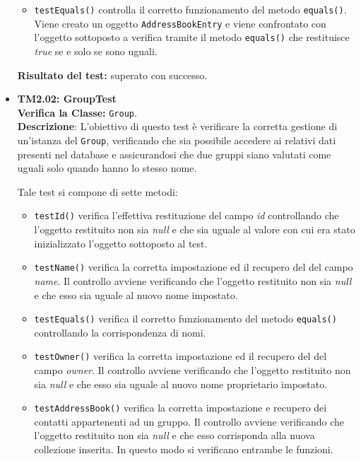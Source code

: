 \begin{itemize}
\begin{itemize}
\item\texttt{testEquals()} controlla  il corretto funzionamento del metodo \texttt{equals()}. Viene creato un oggetto \texttt{AddressBookEntry} e viene confrontato con l'oggetto sottoposto a verifica tramite il metodo \texttt{equals()} che restituisce \textit{true} se e solo se sono uguali.
\end{itemize}
\textbf{Risultato del test:} superato con successo.

\item[\passed] \textbf{TM2.02: GroupTest}\\
\textbf{Verifica la Classe:} \texttt{Group}.\\
\textbf{Descrizione}: L'obiettivo di questo test è verificare la corretta gestione di un'istanza del  \texttt{Group}, verificando che sia possibile accedere ai relativi dati presenti nel database e assicurandosi che due gruppi siano valutati come uguali solo quando hanno lo stesso nome.

Tale test si compone di sette metodi:
\begin{itemize}

\item \texttt{testId()} verifica l'effettiva restituzione del campo \textit{id} controllando che l'oggetto restituito non sia \textit{null} e che sia uguale al valore con cui era stato inizializzato l'oggetto sottoposto al test.

\item \texttt{testName()}
verifica la corretta impostazione ed il recupero del del campo \textit{name}. Il controllo avviene verificando che l'oggetto restituito non sia \textit{null} e che esso sia uguale al nuovo nome impostato. 

\item \texttt{testEquals()} 
verifica il corretto funzionamento del metodo \texttt{equals()} controllando la corrispondenza di nomi. 

\item \texttt{testOwner()} verifica la corretta impostazione ed il recupero del del campo \textit{owner}. Il controllo avviene verificando che l'oggetto restituito non sia \textit{null} e che esso sia uguale al nuovo nome proprietario impostato. 

\item \texttt{testAddressBook()} verifica la corretta impostazione e recupero dei contatti appartenenti ad un gruppo.
Il controllo avviene verificando che l'oggetto restituito non sia \textit{null} e che esso corrisponda alla nuova collezione inserita.
In questo modo si verificano entrambe le funzioni.


\end{itemize}
\end{itemize}
